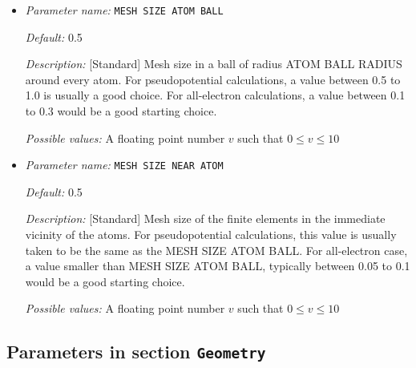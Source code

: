 \begin{itemize}
{\it Possible values:} An integer $n$ such that $1\leq n \leq 10$
\item {\it Parameter name:} {\tt MESH SIZE ATOM BALL}
\label{parameters:Finite element mesh parameters/Auto mesh generation parameters/MESH SIZE ATOM BALL}
\label{parameters:Finite_20element_20mesh_20parameters/Auto_20mesh_20generation_20parameters/MESH_20SIZE_20ATOM_20BALL}




{\it Default:} 0.5


{\it Description:} [Standard] Mesh size in a ball of radius ATOM BALL RADIUS around every atom. For pseudopotential calculations, a value between 0.5 to 1.0 is usually a good choice. For all-electron calculations, a value between 0.1 to 0.3 would be a good starting choice.


{\it Possible values:} A floating point number $v$ such that $0 \leq v \leq 10$
\item {\it Parameter name:} {\tt MESH SIZE NEAR ATOM}
\label{parameters:Finite element mesh parameters/Auto mesh generation parameters/MESH SIZE NEAR ATOM}
\label{parameters:Finite_20element_20mesh_20parameters/Auto_20mesh_20generation_20parameters/MESH_20SIZE_20NEAR_20ATOM}




{\it Default:} 0.5


{\it Description:} [Standard] Mesh size of the finite elements in the immediate vicinity of the atoms. For pseudopotential calculations, this value is usually taken to be the same as the MESH SIZE ATOM BALL. For all-electron case, a value smaller than MESH SIZE ATOM BALL, typically between 0.05 to 0.1 would be a good starting choice.


{\it Possible values:} A floating point number $v$ such that $0 \leq v \leq 10$
\end{itemize}

\subsection{Parameters in section \tt Geometry}
\label{parameters:Geometry}

